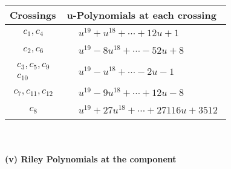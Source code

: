 \documentclass[1p]{elsarticle_modified}
\theoremstyle{definition}
\begin{document}
\begin{tabular}{m{50pt}|m{274pt}}
Crossings & \hspace{64pt}u-Polynomials at each crossing \\
\hline $$\begin{aligned}c_{1},c_{4}\end{aligned}$$&$\begin{aligned}
&u^{19}+u^{18}+\cdots+12 u+1
\end{aligned}$\\
\hline $$\begin{aligned}c_{2},c_{6}\end{aligned}$$&$\begin{aligned}
&u^{19}-8 u^{18}+\cdots-52 u+8
\end{aligned}$\\
\hline $$\begin{aligned}c_{3},c_{5},c_{9}\\c_{10}\end{aligned}$$&$\begin{aligned}
&u^{19}- u^{18}+\cdots-2 u-1
\end{aligned}$\\
\hline $$\begin{aligned}c_{7},c_{11},c_{12}\end{aligned}$$&$\begin{aligned}
&u^{19}-9 u^{18}+\cdots+12 u-8
\end{aligned}$\\
\hline $$\begin{aligned}c_{8}\end{aligned}$$&$\begin{aligned}
&u^{19}+27 u^{18}+\cdots+27116 u+3512
\end{aligned}$\\
\hline
\end{tabular}\\~\\
\newpage\renewcommand{\arraystretch}{1}
\flushleft \textbf{(v) Riley Polynomials at the component}\newline \\
\end{document}
